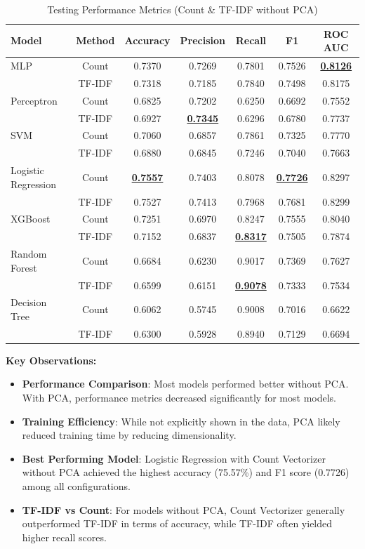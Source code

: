 \begin{table}[H]
    \centering
    \caption{Testing Performance Metrics (Count \& TF-IDF without PCA)}
    \label{tab:testing-count-tfidf}
    \begin{tabular}{|l|c|c|c|c|c|c|}
        \hline
        \textbf{Model} & \textbf{Method} & \textbf{Accuracy} & \textbf{Precision} & \textbf{Recall} & \textbf{F1} & \textbf{ROC AUC} \\
        \hline
        MLP & Count & 0.7370 & 0.7269 & 0.7801 & 0.7526 & \textbf{\underline{0.8126}} \\
        & TF-IDF & 0.7318 & 0.7185 & 0.7840 & 0.7498 & 0.8175 \\
        \hline
        Perceptron & Count & 0.6825 & 0.7202 & 0.6250 & 0.6692 & 0.7552 \\
        & TF-IDF & 0.6927 & \textbf{\underline{0.7345}} & 0.6296 & 0.6780 & 0.7737 \\
        \hline
        SVM & Count & 0.7060 & 0.6857 & 0.7861 & 0.7325 & 0.7770 \\
        & TF-IDF & 0.6880 & 0.6845 & 0.7246 & 0.7040 & 0.7663 \\
        \hline
        Logistic Regression & Count & \textbf{\underline{0.7557}} & 0.7403 & 0.8078 & \textbf{\underline{0.7726}} & 0.8297 \\
        & TF-IDF & 0.7527 & 0.7413 & 0.7968 & 0.7681 & 0.8299 \\
        \hline
        XGBoost & Count & 0.7251 & 0.6970 & 0.8247 & 0.7555 & 0.8040 \\
        & TF-IDF & 0.7152 & 0.6837 & \textbf{\underline{0.8317}} & 0.7505 & 0.7874 \\
        \hline
        Random Forest & Count & 0.6684 & 0.6230 & 0.9017 & 0.7369 & 0.7627 \\
        & TF-IDF & 0.6599 & 0.6151 & \textbf{\underline{0.9078}} & 0.7333 & 0.7534 \\
        \hline
        Decision Tree & Count & 0.6062 & 0.5745 & 0.9008 & 0.7016 & 0.6622 \\
        & TF-IDF & 0.6300 & 0.5928 & 0.8940 & 0.7129 & 0.6694 \\
        \hline
    \end{tabular}
\end{table}

\textbf{Key Observations:}
\begin{itemize}
    \item \textbf{Performance Comparison}: Most models performed better without PCA. With PCA, performance metrics decreased significantly for most models.
    \item \textbf{Training Efficiency}: While not explicitly shown in the data, PCA likely reduced training time by reducing dimensionality.
    \item \textbf{Best Performing Model}: Logistic Regression with Count Vectorizer without PCA achieved the highest accuracy (75.57\%) and F1 score (0.7726) among all configurations.
    \item \textbf{TF-IDF vs Count}: For models without PCA, Count Vectorizer generally outperformed TF-IDF in terms of accuracy, while TF-IDF often yielded higher recall scores.
\end{itemize}
